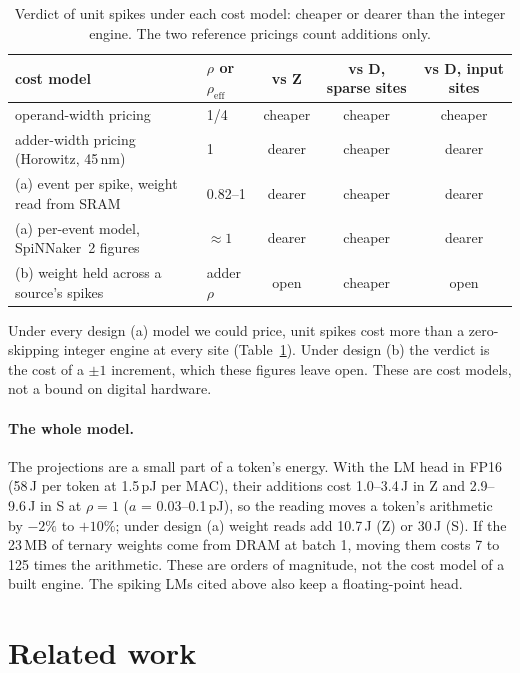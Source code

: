 \documentclass[11pt]{article}
\newcommand{\rhoeff}{\rho_{\mathrm{eff}}}
\begin{document}
\begin{table}[t]
\centering\footnotesize
\caption{Verdict of unit spikes under each cost model: cheaper or dearer than the integer engine.
The two reference pricings count additions only.}
\label{tab:cost}
\begin{tabular}{@{}llccc@{}}
\toprule
cost model & $\rho$ or $\rhoeff$ & vs Z & vs D, sparse sites & vs D, input sites \\
\midrule
operand-width pricing & 1/4 & cheaper & cheaper & cheaper \\
adder-width pricing (Horowitz, 45\,nm) & 1 & dearer & cheaper & dearer \\
(a) event per spike, weight read from SRAM & 0.82--1 & dearer & cheaper & dearer \\
(a) per-event model, SpiNNaker~2 figures & $\approx 1$ & dearer & cheaper & dearer \\
(b) weight held across a source's spikes & adder $\rho$ & open & cheaper & open \\
\bottomrule
\end{tabular}
\end{table}

Under every design (a) model we could price, unit spikes cost more than a zero-skipping integer
engine at every site (Table~\ref{tab:cost}). Under design (b) the verdict is the cost of a
$\pm 1$ increment, which these figures leave open. These are cost models, not a bound on digital
hardware.

\paragraph{The whole model.} The projections are a small part of a token's energy. With the LM
head in FP16 (58\,\textmu J per token at 1.5\,pJ per MAC), their additions cost
1.0--3.4\,\textmu J in Z and 2.9--9.6\,\textmu J in S at $\rho = 1$ ($a$ = 0.03--0.1\,pJ), so
the reading moves a token's arithmetic by $-2\%$ to $+10\%$; under design (a) weight reads add
10.7\,\textmu J (Z) or 30\,\textmu J (S). If the 23\,MB of ternary weights come from DRAM at
batch 1, moving them costs 7 to 125 times the arithmetic. These are orders of magnitude, not the
cost model of a built engine. The spiking LMs cited above also keep a floating-point head.

\section{Related work}
\label{sec:related}
\end{document}
